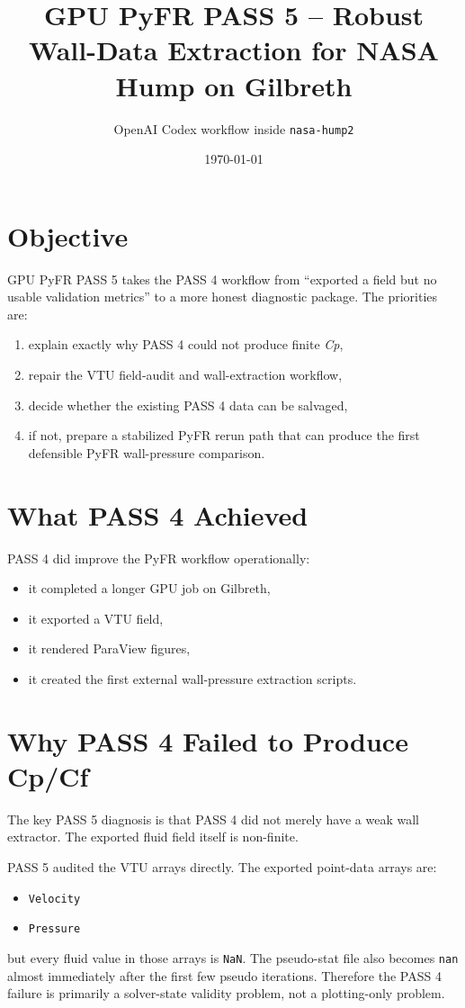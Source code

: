 \documentclass[11pt]{article}
\title{GPU PyFR PASS 5 -- Robust Wall-Data Extraction for NASA Hump on Gilbreth}
\author{OpenAI Codex workflow inside \texttt{nasa-hump2}}
\date{\today}
\begin{document}
\maketitle

\section{Objective}
GPU PyFR PASS 5 takes the PASS 4 workflow from ``exported a field but no usable validation metrics'' to a more honest diagnostic package. The priorities are:
\begin{enumerate}
  \item explain exactly why PASS 4 could not produce finite \textit{Cp},
  \item repair the VTU field-audit and wall-extraction workflow,
  \item decide whether the existing PASS 4 data can be salvaged,
  \item if not, prepare a stabilized PyFR rerun path that can produce the first defensible PyFR wall-pressure comparison.
\end{enumerate}

\section{What PASS 4 Achieved}
PASS 4 did improve the PyFR workflow operationally:
\begin{itemize}
  \item it completed a longer GPU job on Gilbreth,
  \item it exported a VTU field,
  \item it rendered ParaView figures,
  \item it created the first external wall-pressure extraction scripts.
\end{itemize}

\section{Why PASS 4 Failed to Produce Cp/Cf}
The key PASS 5 diagnosis is that PASS 4 did not merely have a weak wall extractor. The exported fluid field itself is non-finite.

PASS 5 audited the VTU arrays directly. The exported point-data arrays are:
\begin{itemize}
  \item \texttt{Velocity}
  \item \texttt{Pressure}
\end{itemize}
but every fluid value in those arrays is \texttt{NaN}. The pseudo-stat file also becomes \texttt{nan} almost immediately after the first few pseudo iterations. Therefore the PASS 4 failure is primarily a solver-state validity problem, not a plotting-only problem.
\end{document}
